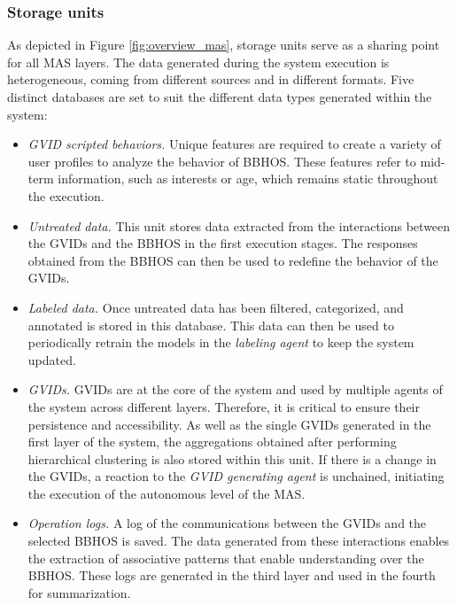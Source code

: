 \subsubsection*{Storage units}
As depicted in Figure \ref{fig:overview_mas}, storage units serve as a sharing point for all MAS layers. The data generated during the system execution is heterogeneous, coming from different sources and in different formats. Five distinct databases are set to suit the different data types generated within the system:
\begin{itemize}
    \item \textit{GVID scripted behaviors.} Unique features are required to create a variety of user profiles to analyze the behavior of BBHOS. These features refer to mid-term information, such as interests or age, which remains static throughout the execution.
    
    \item \textit{Untreated data.} This unit stores data extracted from the interactions between the GVIDs and the BBHOS in the first execution stages. The responses obtained from the BBHOS can then be used to redefine the behavior of the GVIDs.
    
    \item \textit{Labeled data.} Once untreated data has been filtered, categorized, and annotated is stored in this database. This data can then be used to periodically retrain the models in the \textit{labeling agent} to keep the system updated. 
    
    \item \textit{GVIDs.} GVIDs are at the core of the system and used by multiple agents of the system across different layers. Therefore, it is critical to ensure their persistence and accessibility. As well as the single GVIDs generated in the first layer of the system, the aggregations obtained after performing hierarchical clustering is also stored within this unit. If there is a change in the GVIDs, a reaction to the \textit{GVID generating agent} is unchained, initiating the execution of the autonomous level of the MAS.
    
    \item \textit{Operation logs.} A log of the communications between the GVIDs and the selected BBHOS is saved. The data generated from these interactions enables the extraction of associative patterns that enable understanding over the BBHOS. These logs are generated in the third layer and used in the fourth for summarization.
\end{itemize}

